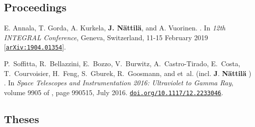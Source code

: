 \documentclass[10pt]{article}
\begin{document}
\vspace{-20pt}
\renewcommand\refname{\phantom{bla}}



\nocite{*}



\subsection*{\phantom{sub} Proceedings}
\vspace{-20pt}
\begin{thebibliography}{1}
\vspace{-5pt}

E. {Annala}, T. {Gorda}, A. {Kurkela}, \textbf{J. {N{\"a}ttil{\"a}}}, and A. {Vuorinen}.
.
\newblock In {\em 12th INTEGRAL Conference}, Geneva, Switzerland, 11-15 February 2019
[\href{https://arxiv.org/abs/1904.01354}{\nolinkurl{arXiv:1904.01354}}].

P.~{Soffitta}, R.~{Bellazzini}, E.~{Bozzo}, V.~{Burwitz}, A.~{Castro-Tirado},
  E.~{Costa}, T.~{Courvoisier}, H.~{Feng}, S.~{Gburek}, R.~{Goosmann}, and
  et~al. (incl. \textbf{J}. \textbf{{N{\"a}ttil{\"a}}} )
.
\newblock In {\em Space Telescopes and Instrumentation 2016: Ultraviolet to
  Gamma Ray}, volume 9905 of {\em \procspie}, page 990515, July 2016.
\href{https://doi.org/10.1117/12.2233046}{\nolinkurl{doi.org/10.1117/12.2233046}}.

\end{thebibliography}

\subsection*{\phantom{sub} Theses}
\end{document}
